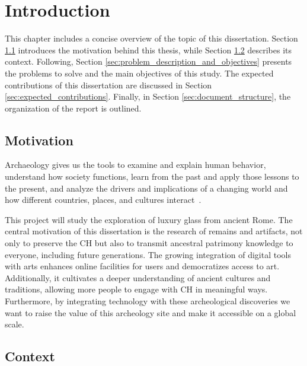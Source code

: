 
%

\chapter{Introduction}
\label{cha:introduction}

This chapter includes a concise overview of the topic of this dissertation. 
Section \ref{sec:motivation} introduces the motivation behind this thesis, while Section \ref{sec:context} describes its context.
Following, Section \ref{sec:problem_description_and_objectives} presents the problems to solve and the main objectives of this study. 
The expected contributions of this dissertation are discussed in Section \ref{sec:expected_contributions}.
Finally, in Section \ref{sec:document_structure}, the organization of the report is outlined.

\section{Motivation}
\label{sec:motivation}
Archaeology gives us the tools to examine and explain human behavior, understand how 
society functions, learn from the past and apply those lessons to the present, and analyze
the drivers and implications of a changing world and how different countries, places, and cultures interact~\cite{oxfordarchaeology2025}.

This project will study the exploration of luxury glass from ancient Rome.
The central motivation of this dissertation is the research of remains and artifacts, not
only to preserve the \gls{CH} but also to transmit ancestral patrimony knowledge to everyone, including future generations. 
The growing integration of digital tools with arts enhances online 
facilities for users and democratizes access to art. Additionally, it cultivates a deeper understanding of ancient cultures and traditions, allowing more people to engage with
\gls{CH} in meaningful ways. Furthermore, by integrating technology with these archeological 
discoveries we want to raise the value of this archeology site and make it accessible on a global scale.


\section{Context}
\label{sec:context}

